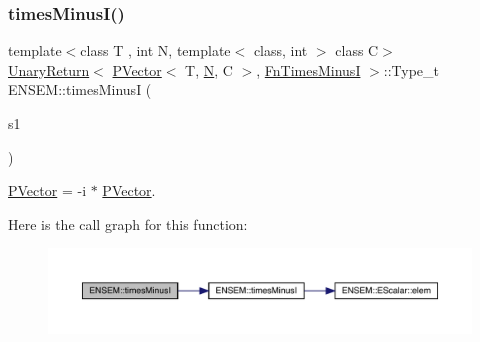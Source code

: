 \subsubsection{\texorpdfstring{timesMinusI()}{timesMinusI()}}
{\footnotesize\ttfamily template$<$class T , int N, template$<$ class, int $>$ class C$>$ \\
\mbox{\hyperlink{structENSEM_1_1UnaryReturn}{Unary\+Return}}$<$ \mbox{\hyperlink{classENSEM_1_1PVector}{P\+Vector}}$<$ T, \mbox{\hyperlink{operator__name__util_8cc_a7722c8ecbb62d99aee7ce68b1752f337}{N}}, C $>$, \mbox{\hyperlink{structENSEM_1_1FnTimesMinusI}{Fn\+Times\+MinusI}} $>$\+::Type\+\_\+t E\+N\+S\+E\+M\+::times\+MinusI (\begin{DoxyParamCaption}\item[{const \mbox{\hyperlink{classENSEM_1_1PVector}{P\+Vector}}$<$ T, \mbox{\hyperlink{operator__name__util_8cc_a7722c8ecbb62d99aee7ce68b1752f337}{N}}, C $>$ \&}]{s1 }\end{DoxyParamCaption})\hspace{0.3cm}{\ttfamily [inline]}}



\mbox{\hyperlink{classENSEM_1_1PVector}{P\+Vector}} = -\/i $\ast$ \mbox{\hyperlink{classENSEM_1_1PVector}{P\+Vector}}. 

Here is the call graph for this function\+:\nopagebreak
\begin{figure}[H]
\begin{center}
\leavevmode
\includegraphics[width=350pt]{d3/dc4/group__primvector_gaa73c49a7eea92a59f41ed2ae3deeab2f_cgraph}
\end{center}
\end{figure}
\mbox{\label{group__primvector_ga17c089532ed62b8ac706539d3d0ecd14}} 
